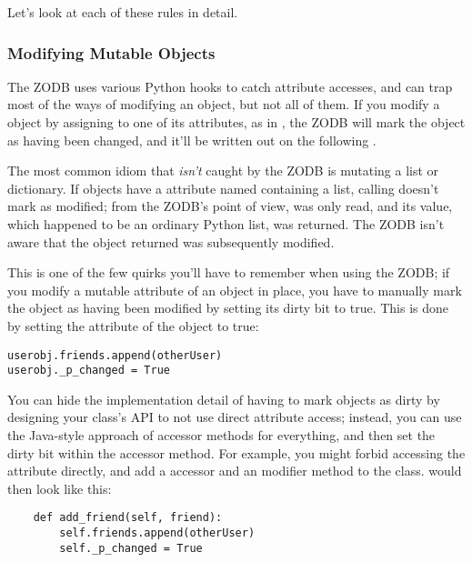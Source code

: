Let's look at each of these rules in detail.

\subsubsection{Modifying Mutable Objects}

The ZODB uses various Python hooks to catch attribute accesses, and
can trap most of the ways of modifying an object, but not all of them.
If you modify a  object by assigning to one of its
attributes, as in , the ZODB will
mark the object as having been changed, and it'll be written out on
the following .

The most common idiom that \emph{isn't} caught by the ZODB is
mutating a list or dictionary.  If  objects have a
attribute named  containing a list, calling
 doesn't mark
 as modified; from the ZODB's point of
view,  was only read, and its value, which
happened to be an ordinary Python list, was returned.  The ZODB isn't
aware that the object returned was subsequently modified.

This is one of the few quirks you'll have to remember when using the
ZODB; if you modify a mutable attribute of an object in place, you
have to manually mark the object as having been modified by setting
its dirty bit to true.  This is done by setting the
 attribute of the object to true:

\begin{verbatim}
userobj.friends.append(otherUser)
userobj._p_changed = True
\end{verbatim}

You can hide the implementation detail of having to mark objects as
dirty by designing your class's API to not use direct attribute
access; instead, you can use the Java-style approach of accessor
methods for everything, and then set the dirty bit within the accessor
method.  For example, you might forbid accessing the 
attribute directly, and add a  accessor and
an  modifier method to the class.  
would then look like this:

\begin{verbatim}
    def add_friend(self, friend):
        self.friends.append(otherUser)
        self._p_changed = True
\end{verbatim}

